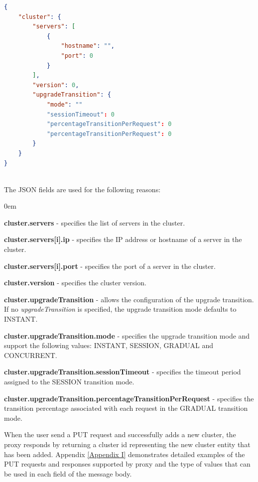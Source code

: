 \documentclass[a4paper,11pt,twoside]{article}
\begin{document}
\begin{lstlisting}[language=json,firstnumber=1]
{
    "cluster": {
        "servers": [
            {
                "hostname": "", 
                "port": 0
            }
        ], 
        "version": 0, 
        "upgradeTransition": {
            "mode": ""
            "sessionTimeout": 0  
            "percentageTransitionPerRequest": 0
            "percentageTransitionPerRequest": 0  
        }
    }
}
\end{lstlisting}

\noindent\\
The JSON fields are used for the following reasons:

\begin{list}{-}{}
  \itemsep0em
  \item\textbf{{cluster.servers}} - specifies the list of servers in the cluster.
  
  \item\textbf{{cluster.servers[i].ip}} - specifies the IP address or hostname of a server in the cluster.
  
  \item\textbf{{cluster.servers[i].port}} - specifies the port of a server in the cluster.
  
  \item\textbf{{cluster.version}} - specifies the cluster version. 
  
  \item\textbf{{cluster.upgradeTransition}} - allows the configuration of the upgrade transition. If no \textit{upgradeTransition} is specified, the upgrade transition mode defaults to INSTANT.  
  
  \item\textbf{{cluster.upgradeTransition.mode}} - specifies the upgrade transition mode and support the following values: INSTANT, SESSION, GRADUAL and CONCURRENT.
   
  \item\textbf{{cluster.upgradeTransition.sessionTimeout}} - specifies the timeout period assigned to the SESSION transition mode.
  
  \item\textbf{{cluster.upgradeTransition.percentageTransitionPerRequest}} - specifies the transition percentage associated with each request in the GRADUAL transition mode.
\end{list}

\noindent
When the user send a PUT request and successfully adds a new cluster, the proxy responds by returning a cluster id representing the new cluster entity that has been added. Appendix \ref{Appendix  I} demonstrates detailed examples of the PUT requests and responses supported by proxy and the type of values that can be used in each field of the message body.
\end{document}
